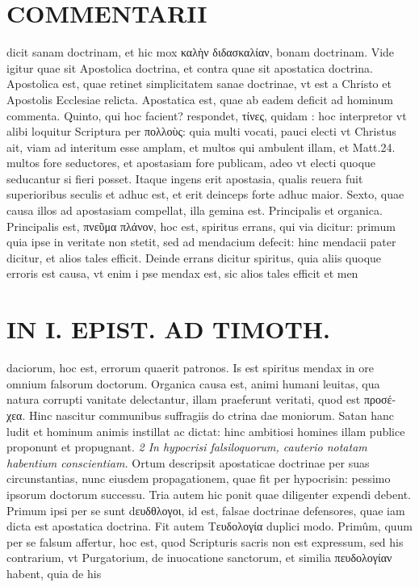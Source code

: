 \documentclass{article}
\begin{document}
\begin{pages}
\section*{COMMENTARII }
\marginpar{[ p.86 ]}\pstart dicit sanam doctrinam, et hic mox καλὴν διδασκαλίαν, bonam doctrinam. Vide igitur quae sit Apostolica doctrina, et contra quae sit apostatica doctrina. Apostolica est, quae retinet simplicitatem sanae doctrinae, vt est a Christo et Apostolis Ecclesiae relicta. Apostatica est, quae ab eadem deficit ad hominum commenta.  \pend\pstart Quinto, qui hoc facient? respondet, τίνες, quidam : hoc interpretor vt alibi loquitur Scriptura per πολλοὺς: quia multi vocati, pauci electi vt Christus ait, viam ad interitum esse amplam, et multos qui ambulent illam, et Matt.24. multos fore seductores, et apostasiam fore publicam, adeo vt electi quoque seducantur si fieri posset. Itaque ingens erit apostasia, qualis reuera fuit superioribus seculis et adhuc est, et erit deinceps forte adhuc maior.  \pend\pstart Sexto, quae causa illos ad apostasiam compellat, illa gemina est. Principalis et organica. Principalis est, πνεῦμα πλάνον, hoc est, spiritus errans, qui via dicitur: primum quia ipse in veritate non stetit, sed ad mendacium defecit: hinc mendacii pater dicitur, et alios tales efficit. Deinde errans dicitur spiritus, quia aliis quoque erroris est causa, vt enim i pse mendax est, sic alios tales efficit et men\pend
\section*{IN I. EPIST. AD TIMOTH. }
\marginpar{[ p.87 ]}\pstart daciorum, hoc est, errorum quaerit patronos. Is est spiritus mendax in ore omnium falsorum doctorum.  \pend\pstart Organica causa est, animi humani leuitas, qua natura corrupti vanitate delectantur, illam praeferunt veritati, quod est προσέ- χεα. Hinc nascitur communibus suffragiis do ctrina dae moniorum. Satan hanc ludit et hominum animis instillat ac dictat: hinc ambitiosi homines illam publice proponunt et propugnant.  \pend
\textit{2 In hypocrisi falsiloquorum, cauterio notatam habentium conscientiam. }\pstart Ortum descripsit apostaticae doctrinae per suas circunstantias, nunc eiusdem propagationem, quae fit per hypocrisin: pessimo ipsorum doctorum successu. Tria autem hic ponit quae diligenter expendi debent. Primum ipsi per se sunt dευδθλογοι, id est, falsae doctrinae defensores, quae iam dicta est apostatica doctrina. Fit autem Τευδολογία duplici modo. Primûm, quum per se falsum affertur, hoc est, quod Scripturis sacris non est expressum, sed his contrarium, vt Purgatorium, de inuocatione sanctorum, et similia πευδολογίαν habent, quia de his  \pend

\end{pages}
\end{document}
